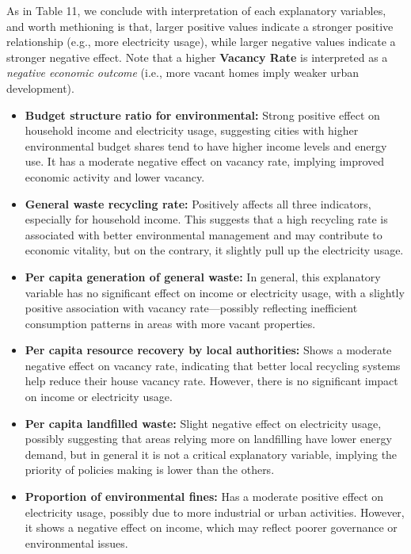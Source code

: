 \documentclass{article}
\begin{document}
\noindent As in Table 11, we conclude with interpretation of each explanatory variables, and worth methioning is that, larger positive values indicate a stronger positive relationship (e.g., more electricity usage), while larger negative values indicate a stronger negative effect. Note that a higher \textbf{Vacancy Rate} is interpreted as a \textit{negative economic outcome} (i.e., more vacant homes imply weaker urban development).

\begin{itemize}
    \item \textbf{Budget structure ratio for environmental:} Strong positive effect on household income and electricity usage, suggesting cities with higher environmental budget shares tend to have higher income levels and energy use. It has a moderate negative effect on vacancy rate, implying improved economic activity and lower vacancy.
    
    \item \textbf{General waste recycling rate:} Positively affects all three indicators, especially for household income. This suggests that a high recycling rate is associated with better environmental management and may contribute to economic vitality, but on the contrary, it slightly pull up the electricity usage.
    
    \item \textbf{Per capita generation of general waste:} In general, this explanatory variable has no significant effect on income or electricity usage, with a slightly positive association with vacancy rate—possibly reflecting inefficient consumption patterns in areas with more vacant properties.
    
    \item \textbf{Per capita resource recovery by local authorities:} Shows a moderate negative effect on vacancy rate, indicating that better local recycling systems help reduce their house vacancy rate. However, there is no significant impact on income or electricity usage.
    
    \item \textbf{Per capita landfilled waste:} Slight negative effect on electricity usage, possibly suggesting that areas relying more on landfilling have lower energy demand, but in general it is not a critical explanatory variable, implying the priority of policies making is lower than the others. 
    
    \item \textbf{Proportion of environmental fines:} Has a moderate positive effect on electricity usage, possibly due to more industrial or urban activities. However, it shows a negative effect on income, which may reflect poorer governance or environmental issues.
    

\end{itemize}
\end{document}
